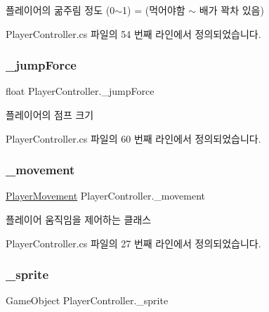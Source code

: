 플레이어의 굶주림 정도 (0$\sim$1) = (먹어야함 $\sim$ 배가 꽉차 있음) 



Player\+Controller.\+cs 파일의 54 번째 라인에서 정의되었습니다.

\mbox{\label{class_player_controller_aaec5e4333fe1c532900ca666c075261c}} 
\subsubsection{\texorpdfstring{\_jumpForce}{\_jumpForce}}
{\footnotesize\ttfamily float Player\+Controller.\+\_\+jump\+Force\hspace{0.3cm}{\ttfamily [private]}}



플레이어의 점프 크기 



Player\+Controller.\+cs 파일의 60 번째 라인에서 정의되었습니다.

\mbox{\label{class_player_controller_ad788cfe2e37318d22d52010dc0fecd57}} 
\subsubsection{\texorpdfstring{\_movement}{\_movement}}
{\footnotesize\ttfamily \mbox{\hyperlink{class_player_movement}{Player\+Movement}} Player\+Controller.\+\_\+movement\hspace{0.3cm}{\ttfamily [private]}}



플레이어 움직임을 제어하는 클래스 



Player\+Controller.\+cs 파일의 27 번째 라인에서 정의되었습니다.

\mbox{\label{class_player_controller_aeb0b2dc2ef34062f72afaf20899ce307}} 
\subsubsection{\texorpdfstring{\_sprite}{\_sprite}}
{\footnotesize\ttfamily Game\+Object Player\+Controller.\+\_\+sprite\hspace{0.3cm}{\ttfamily [private]}}



